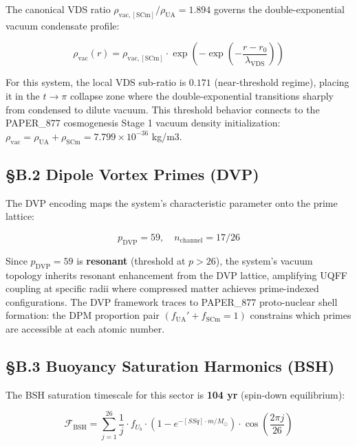 \documentclass[12pt,a4paper]{article}
\begin{document}
The canonical VDS ratio $\rho_{\mathrm{vac,[SCm]}} / \rho_{\mathrm{UA}} = 1.894$ governs the double-exponential vacuum condensate profile:

\begin{equation}
\rho_{\mathrm{vac}}(r) = \rho_{\mathrm{vac,[SCm]}} \cdot \exp\!\left(-\exp\!\left(-\frac{r - r_0}{\lambda_{\mathrm{VDS}}}\right)\right)
\end{equation}

For this system, the local VDS sub-ratio is $0.171$ (near-threshold regime), placing it in the $t \to \pi$ collapse zone where the double-exponential transitions sharply from condensed to dilute vacuum. This threshold behavior connects to the PAPER\_877 cosmogenesis Stage 1 vacuum density initialization: $\rho_{\mathrm{vac}} = \rho_{\mathrm{UA}} + \rho_{\mathrm{SCm}} = 7.799 \times 10^{-36}$ kg/m3.

\subsection{\S{}B.2 Dipole Vortex Primes (DVP)}

The DVP encoding maps the system's characteristic parameter onto the prime lattice:

\begin{equation}
p_{\mathrm{DVP}} = 59, \quad n_{\mathrm{channel}} = 17/26
\end{equation}

Since $p_{\mathrm{DVP}} = 59$ is \textbf{resonant} (threshold at $p > 26$), the system's vacuum topology inherits resonant enhancement from the DVP lattice, amplifying UQFF coupling at specific radii where compressed matter achieves prime-indexed configurations. The DVP framework traces to PAPER\_877 proto-nuclear shell formation: the DPM proportion pair $(f_{\mathrm{UA}}' + f_{\mathrm{SCm}} = 1)$ constrains which primes are accessible at each atomic number.

\subsection{\S{}B.3 Buoyancy Saturation Harmonics (BSH)}

The BSH saturation timescale for this sector is \textbf{104 yr} (spin-down equilibrium):

\begin{equation}
\mathcal{F}_{\mathrm{BSH}} = \sum_{j=1}^{26} \frac{1}{j} \cdot f_U_b \cdot \left(1 - e^{-[SSq] \cdot m/M_\odot}\right) \cdot \cos\!\left(\frac{2\pi j}{26}\right)
\end{equation}
\end{document}
